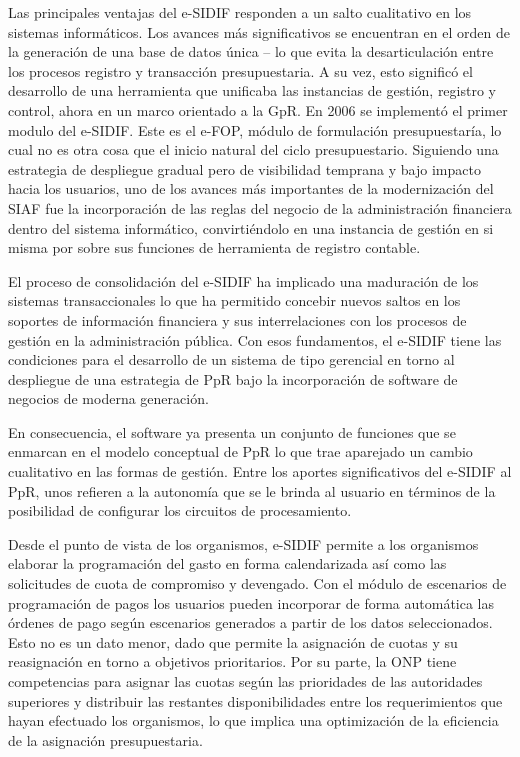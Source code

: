 Las principales ventajas del e-SIDIF responden a un salto cualitativo en los sistemas informáticos. Los avances más significativos se encuentran en el orden de la generación de una base de datos única – lo que evita la desarticulación entre los procesos registro y transacción presupuestaria. A su vez, esto significó el desarrollo de una herramienta que unificaba las instancias de gestión, registro y control, ahora en un marco orientado a la GpR.
En 2006 se implementó el primer modulo del e-SIDIF. Este es el e-FOP, módulo de formulación presupuestaría, lo cual no es otra cosa que el inicio natural del ciclo presupuestario. Siguiendo una estrategia de despliegue gradual pero de visibilidad temprana y bajo impacto hacia los usuarios, uno de los avances más importantes de la modernización del SIAF fue la incorporación de las reglas del negocio de la administración financiera dentro del sistema informático, convirtiéndolo en una instancia de gestión en si misma por sobre sus funciones de herramienta de registro contable. 

El proceso de consolidación del e-SIDIF ha implicado una maduración de los sistemas transaccionales lo que ha permitido concebir nuevos saltos en los soportes de información financiera y sus interrelaciones con los procesos de gestión en la administración pública. Con esos fundamentos, el e-SIDIF tiene las condiciones para el desarrollo de un sistema de tipo gerencial en torno al despliegue de una estrategia de PpR bajo la incorporación de software de negocios de moderna generación.

En consecuencia, el software ya presenta un conjunto de funciones que se enmarcan en el modelo conceptual de PpR lo que trae aparejado un cambio cualitativo en las formas de gestión. Entre los aportes significativos del e-SIDIF al PpR, unos refieren a la autonomía que se le brinda al usuario en términos de la posibilidad de configurar los circuitos de procesamiento. 

Desde el punto de vista de los organismos, e-SIDIF permite a los organismos elaborar la programación del gasto en forma calendarizada así como las solicitudes de cuota de compromiso y devengado. Con el módulo de escenarios de programación de pagos los usuarios pueden incorporar de forma automática las órdenes de pago según escenarios generados a partir de los datos seleccionados. Esto no es un dato menor, dado que permite la asignación de cuotas y su reasignación en torno a objetivos prioritarios. Por su parte, la ONP tiene competencias para asignar las cuotas según las prioridades de las autoridades superiores y distribuir las restantes disponibilidades entre los requerimientos que hayan efectuado los organismos, lo que implica una optimización de la eficiencia de la asignación presupuestaria.

